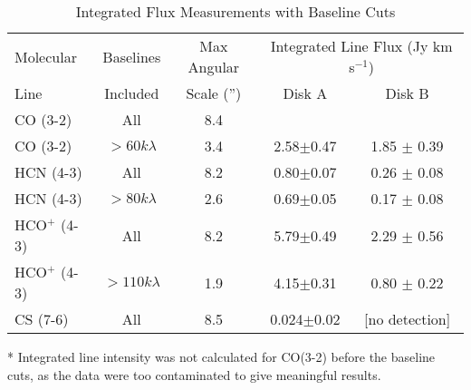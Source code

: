 \begin{table}
  \begin{threeparttable}
    \centering
    \caption{Integrated Flux Measurements with Baseline Cuts}
    \label{tab:baseline_cutting_table}
    \renewcommand{\arraystretch}{1.2}
    \begin{tabular}{l | c | c | c  c }
      \toprule \toprule
      {Molecular}     & Baselines       & Max Angular & \multicolumn{2}{c}{Integrated Line Flux (Jy km s$^{-1}$)} \\
      Line            & Included        & Scale ('')  & Disk A        & Disk B \\
      \midrule %
      CO (3-2)        & All             & 8.4        & \tnote{*}      &  \tnote{*} \\
      CO (3-2)        & $>60 k\lambda$  & 3.4        & 2.58$\pm$0.47  & 1.85 $\pm$ 0.39 \\
      HCN (4-3)       & All             & 8.2        & 0.80$\pm$0.07  &  0.26 $\pm$ 0.08 \\
      HCN (4-3)       & $>80 k\lambda$  & 2.6        & 0.69$\pm$0.05  &  0.17 $\pm$ 0.08 \\
      HCO$^{+}$ (4-3) & All             & 8.2        & 5.79$\pm$0.49  &  2.29 $\pm$ 0.56 \\
      HCO$^{+}$ (4-3) & $>110 k\lambda$ & 1.9        & 4.15$\pm$0.31  &  0.80 $\pm$ 0.22 \\
      CS (7-6)        & All             & 8.5        & 0.024$\pm$0.02 & [no detection] \\
      \bottomrule
    \end{tabular}
    \begin{tablenotes}\footnotesize
      \item[*] Integrated line intensity was not calculated for CO(3-2) before the baseline cuts, as the data were too contaminated to give meaningful results.
    \end{tablenotes}
  \end{threeparttable}
\end{table}








